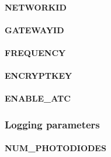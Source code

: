 \documentclass[10pt]{article}
\begin{document}
\paragraph{NETWORKID}

\paragraph{GATEWAYID}

\paragraph{FREQUENCY}

\paragraph{ENCRYPTKEY}

\paragraph{ENABLE\_ATC}

\subsubsection{Logging parameters}

\paragraph{NUM\_PHOTODIODES}
\end{document}
